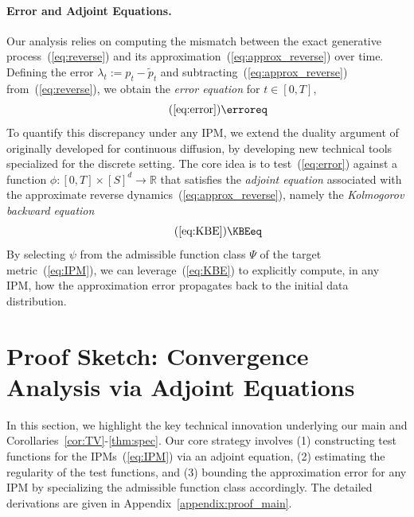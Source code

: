 \documentclass{article} %
\def\eqref#1{equation~\ref{#1}}
\renewcommand{\eqref}[1]{\textup{(\ref{#1})}}
\begin{document}
\paragraph{Error and Adjoint Equations.} Our analysis relies on computing the mismatch between the exact generative process~\eqref{eq:reverse} and its approximation~\eqref{eq:approx_reverse} over time. Defining the error $\lambda_t:=p_t-\tilde{p}_t$ and subtracting~\eqref{eq:approx_reverse} from~\eqref{eq:reverse}, we obtain the \emph{error equation} for $t \in [0, T]$,
\begin{equation}\tag{\ref*{eq:error}}  
    \erroreq
\end{equation}
To quantify this discrepancy under any IPM, we extend the duality argument of \citet[Section~4.1]{mimikos2024score} originally developed for continuous diffusion, by developing new technical tools specialized for the discrete setting. The core idea is to test~\eqref{eq:error} against a function $\phi:[0, T] \times [S]^d \to \mathbb{R}$ that satisfies the \emph{adjoint equation} associated with the approximate reverse dynamics~\eqref{eq:approx_reverse}, namely the \emph{Kolmogorov backward equation} 
\begin{equation}\tag{\ref*{eq:KBE}}   
    \KBEeq
\end{equation}
By selecting $\psi$ from the admissible function class $\Psi$ of the target metric~\eqref{eq:IPM}, we can leverage~\eqref{eq:KBE} to explicitly compute, in any IPM, how the approximation error propagates back to the initial data distribution.

\section{Proof Sketch: Convergence Analysis via Adjoint Equations}
In this section, we highlight the key technical innovation underlying our main  and Corollaries~\ref{cor:TV}-\ref{thm:spec}. Our core strategy involves (1) constructing test functions for the IPMs~\eqref{eq:IPM} via an adjoint equation, (2) estimating the regularity of the test functions, and (3) bounding the approximation error for any IPM by specializing the admissible function class accordingly. The detailed derivations are given in Appendix~\ref{appendix:proof_main}.
\end{document}
